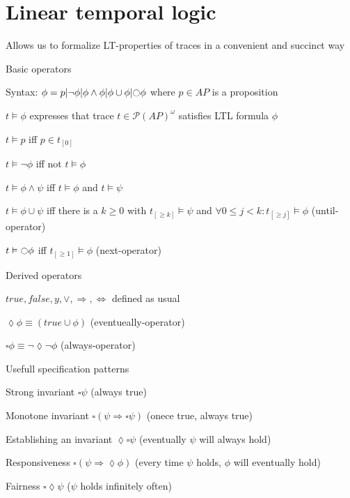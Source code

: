 \section{Linear temporal logic}
\enumstart
	\item Allows us to formalize LT-properties of traces in a convenient and succinct way
	\item Basic operators
	\enumstart
		\item Syntax: $\phi = p | \lnot \phi | \phi \land \phi | \phi \cup \phi | \fullmoon \phi$ where $p \in AP$ is a proposition
		\item $t \vDash \phi$ expresses that trace $t \in \mathcal{P}(AP)^\omega$ satisfies LTL formula $\phi$
		\item $t \vDash p$ iff $p \in t_{[0]}$
		\item $t \vDash \lnot \phi$ iff not $t \vDash \phi$
		\item $t \vDash \phi \land \psi$ iff $t \vDash \phi$ and $t \vDash \psi$
		\item $t \vDash \phi \cup \psi$ iff there is a $k \ge 0$ with $t_{[\ge k]} \vDash \psi$ and $\forall 0 \le j < k: t_{[\ge j]} \vDash \phi$ (until-operator)
		\item $t \vDash \fullmoon\phi$ iff $t_{[\ge 1]} \vDash \phi$ (next-operator)
	\enumend
	\item Derived operators
	\enumstart
		\item $true, false, y, \lor, \Rightarrow, \Leftrightarrow$ defined as usual
		\item $\lozenge \phi \equiv (true \cup \phi)$ (eventueally-operator)
		\item $\square \phi \equiv \lnot \lozenge \lnot \phi$ (always-operator)
	\enumend
	\item Usefull specification patterns
	\enumstart
		\item Strong invariant $\square \psi$ (always true)
		\item Monotone invariant $\square (\psi \Rightarrow \square\psi)$ (onece true, always true)
		\item Establishing an invariant $\lozenge \square \psi$ (eventually $\psi$ will always hold)
		\item Responsiveness $\square(\psi \Rightarrow \lozenge \phi)$ (every time $\psi$ holds, $\phi$ will eventually hold)
		\item Fairness $\square \lozenge \psi$ ($\psi$ holds infinitely often)
	\enumend
\enumend
